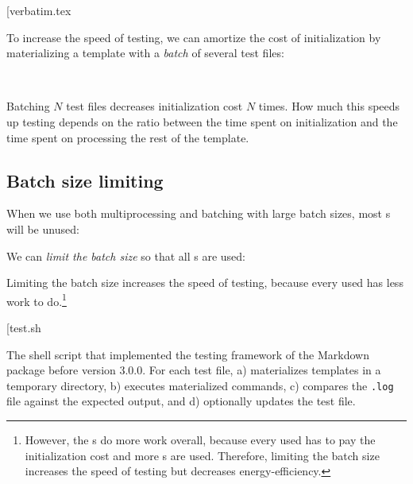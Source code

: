 \documentclass[final]{ltugboat}
\makeatletter
\newenvironment{listing*}{\@dblfloat{listing}}{\end@dblfloat}
\newcounter{listing}
\makeatother
\begin{document}
\smallskip
\noindent
\example*[{verbatim.tex}

\smallskip

To increase the speed of testing, we can amortize the cost of initialization by materializing a template with a \emph{batch} of several test files:

\medskip
\noindent
{} \\

\smallskip
\noindent
Batching $N$ test files decreases initialization cost $N$ times. How much this speeds up testing depends on the ratio between the time spent on initialization and the time spent on processing the rest of the template.

\subsection{Batch size limiting}

When we use both multiprocessing and batching with large batch sizes, most s will be unused:

\smallskip
\noindent
\begingroup
\centering

\par
\endgroup

\smallskip
\noindent
We can \emph{limit the batch size} so that all s are used:

\medskip
\noindent
\begingroup
\centering

\par
\endgroup

\smallskip
\noindent
{}
Limiting the batch size increases the speed of testing, because every used  has less work to do.\footnote{However, the s do more work overall, because every used  has to pay the initialization cost and more s are used. Therefore, limiting the batch size increases the speed of testing but decreases energy-efficiency.}

\begin{listing*}
\bigExample*[{test.sh}
\caption{The shell script  that implemented the testing framework of the Markdown package before version 3.0.0. For each test file,  a) materializes templates in a temporary directory, b) executes materialized commands, c) compares the \texttt{.log} file against the expected output, and d) optionally updates the test file.}
\label{lst:test.sh}
\end{listing*}
\end{document}
